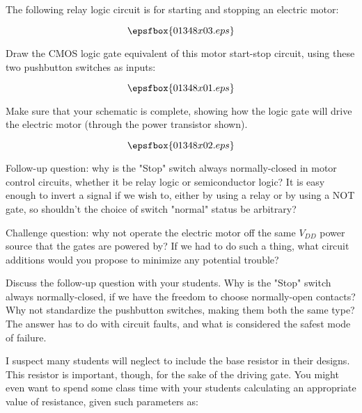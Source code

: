 

The following relay logic circuit is for starting and stopping an electric motor:

$$\epsfbox{01348x03.eps}$$

Draw the CMOS logic gate equivalent of this motor start-stop circuit, using these two pushbutton switches as inputs:

$$\epsfbox{01348x01.eps}$$

Make sure that your schematic is complete, showing how the logic gate will drive the electric motor (through the power transistor shown).







$$\epsfbox{01348x02.eps}$$

\vskip 10pt

Follow-up question: why is the "Stop" switch always normally-closed in motor control circuits, whether it be relay logic or semiconductor logic?  It is easy enough to invert a signal if we wish to, either by using a relay or by using a NOT gate, so shouldn't the choice of switch "normal" status be arbitrary?

\vskip 10pt

Challenge question: why not operate the electric motor off the same $V_{DD}$ power source that the gates are powered by?  If we had to do such a thing, what circuit additions would you propose to minimize any potential trouble?







Discuss the follow-up question with your students.  Why is the "Stop" switch always normally-closed, if we have the freedom to choose normally-open contacts?  Why not standardize the pushbutton switches, making them both the same type?  The answer has to do with circuit faults, and what is considered the safest mode of failure.

I suspect many students will neglect to include the base resistor in their designs.  This resistor is important, though, for the sake of the driving gate.  You might even want to spend some class time with your students calculating an appropriate value of resistance, given such parameters as:

